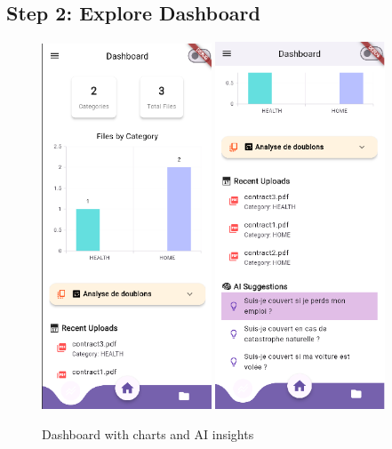 \subsection*{Step 2: Explore Dashboard}

\begin{figure}[H]
    \centering
    \includegraphics[width=0.45\textwidth]{frontend/dashboard_ui.png}
    \includegraphics[width=0.45\textwidth]{frontend/dashboard_ui2.png}
    \caption{Dashboard with charts and AI insights}
\end{figure}

